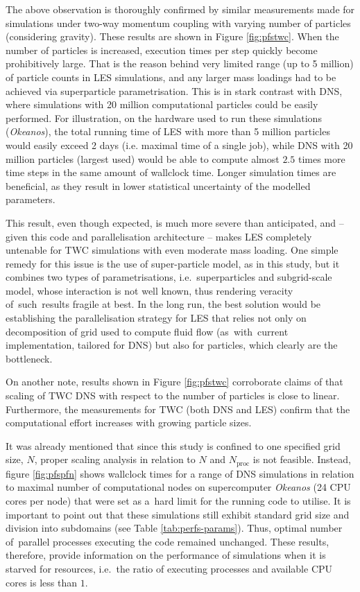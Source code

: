 \documentclass{pracamgren}
\begin{document}
The above observation is thoroughly confirmed by similar measurements made for simulations under two-way momentum coupling with varying number of particles (considering gravity).
These results are shown in Figure \ref{fig:pfstwc}.
When the number of particles is increased, execution times per step quickly become prohibitively large.
That is the reason behind very limited range (up to 5 million) of particle counts in LES simulations, and any larger mass loadings had to be achieved via superparticle parametrisation.
This is in stark contrast with DNS, where simulations with 20 million computational particles could be easily performed.
For illustration, on the hardware used to run these simulations (\emph{Okeanos}), the total running time of LES with more than 5 million particles would easily exceed 2 days (i.e. maximal time of a single job), while DNS with 20 million particles (largest used) would be able to compute almost $2.5$ times more time steps in the same amount of wallclock time.
Longer simulation times are beneficial, as they result in lower statistical uncertainty of the modelled parameters.

This result, even though expected, is much more severe than anticipated, and -- given this code and parallelisation architecture -- makes LES completely untenable for TWC simulations with even moderate mass loading.
One simple remedy for this issue is the use of super-particle model, as in this study, but it combines two types of parametrisations, i.e.~superparticles and subgrid-scale model, whose interaction is not well known, thus rendering veracity of~such~results fragile at best.
In the long run, the best solution would be establishing the parallelisation strategy for LES that relies not only on decomposition of grid used to compute fluid flow (as~with~current implementation, tailored for DNS) but also for particles, which clearly are the bottleneck.

On another note, results shown in Figure \ref{fig:pfstwc} corroborate claims of \textcite{Rosa2022} that scaling of TWC DNS with respect to the number of particles is close to linear.
Furthermore, the measurements for TWC (both DNS and LES) confirm that the computational effort increases with growing particle sizes.

\medskip

It was already mentioned that since this study is confined to one specified grid size, $N$, proper scaling analysis in relation to $N$ and $N_\text{proc}$ is not feasible.
Instead, figure \ref{fig:pfspfn} shows wallclock times for a range of DNS simulations in relation to maximal number of computational nodes on supercomputer \emph{Okeanos} (24 CPU cores per node) that were set as a~hard limit for the running code to utilise.
It is important to point out that these simulations still exhibit standard grid size and division into subdomains (see Table \ref{tab:perfs-params}).
Thus, optimal number of~parallel processes executing the code remained unchanged.
These results, therefore, provide information on the performance of simulations when it is starved for resources, i.e.~the ratio of executing processes and available CPU cores is less than $1$.
\end{document}

